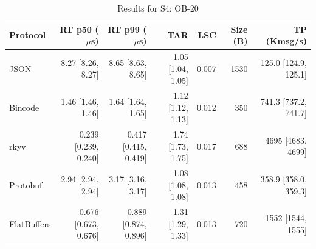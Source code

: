 \begin{table}[htbp]
\centering
\caption{Results for S4: OB-20}
\label{tab:results_book_medium}
\begin{tabular}{l r r r r r r}
\hline
Protocol & RT p50 ($\mu$s) & RT p99 ($\mu$s) & TAR & LSC & Size (B) & TP (Kmsg/s) \\
\hline
  JSON & 8.27 [8.26, 8.27] & 8.65 [8.63, 8.65] & 1.05 [1.04, 1.05] & 0.007 & 1530 & 125.0 [124.9, 125.1] \\
  Bincode & 1.46 [1.46, 1.46] & 1.64 [1.64, 1.65] & 1.12 [1.12, 1.13] & 0.012 & 350 & 741.3 [737.2, 741.7] \\
  rkyv & 0.239 [0.239, 0.240] & 0.417 [0.415, 0.419] & 1.74 [1.73, 1.75] & 0.017 & 688 & 4695 [4683, 4699] \\
  Protobuf & 2.94 [2.94, 2.94] & 3.17 [3.16, 3.17] & 1.08 [1.08, 1.08] & 0.013 & 458 & 358.9 [358.0, 359.3] \\
  FlatBuffers & 0.676 [0.673, 0.676] & 0.889 [0.874, 0.896] & 1.31 [1.29, 1.33] & 0.013 & 720 & 1552 [1544, 1555] \\
\hline
\end{tabular}
\end{table}